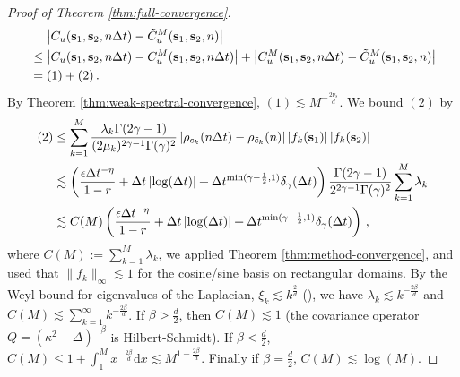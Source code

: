 \documentclass[12pt]{article} %
\newcommand{\dint}{\text{d}}
\newcommand{\abs}[1]{\left| #1 \right|}
\begin{document}
\begin{proof}[Proof of Theorem \ref{thm:full-convergence}]

\begin{align*}
    & \, \quad \abs{C_u(\mathbf{s}_1, \mathbf{s}_2, {n \Delta t}) - \Tilde{C}_u^M(\mathbf{s}_1, \mathbf{s}_2, n)} \\
    & \leq \abs{C_u(\mathbf{s}_1, \mathbf{s}_2, {n \Delta t}) - C_u^M(\mathbf{s}_1, \mathbf{s}_2, {n \Delta t})} + \abs{C_u^M(\mathbf{s}_1, \mathbf{s}_2, {n \Delta t}) - \Tilde{C}_u^M(\mathbf{s}_1, \mathbf{s}_2, n)} \\
    & = (1) + (2) \, .
\end{align*}
By Theorem \ref{thm:weak-spectral-convergence}, $(1) \lesssim M^{-\frac{2\nu_s}{d}}$. We bound $(2)$ by 
\begin{align*}
    (2) &\leq \sum_{k = 1}^M \frac{\lambda_k \Gamma(2 \gamma - 1)}{(2 \mu_k)^{2 \gamma - 1}\Gamma(\gamma)^2} \abs{\rho_{c_k}({n \Delta t}) - \rho_{\Tilde{c}_k}(n)} \abs{f_k(\mathbf{s}_1)} \abs{f_k(\mathbf{s}_2)} \\
    & \lesssim \left( \frac{\epsilon \Delta t^{- \eta}}{1 - r} + \Delta t \abs{\log(\Delta t)} + \Delta t^{\min(\gamma - \frac{1}{2}, 1)} \delta_{\gamma}(\Delta t) \right) \frac{\Gamma(2 \gamma - 1)}{2^{2 \gamma - 1} \Gamma(\gamma)^2} \sum_{k = 1}^M \lambda_k\\
    & \lesssim C(M) \left(\frac{\epsilon \Delta t^{ - \eta}}{1 - r} + \Delta t \abs{\log(\Delta t)} + \Delta t^{\min(\gamma - \frac{1}{2}, 1)} \delta_{\gamma}(\Delta t)\right) \, ,
\end{align*}
where $C(M) := \sum_{k = 1}^M \lambda_k$, we applied Theorem \ref{thm:method-convergence}, and used that $\|f_k\|_\infty \lesssim 1$ for the cosine/sine basis on rectangular domains. %
 By the Weyl bound for eigenvalues of the Laplacian,  $\xi_k \lesssim k^{\frac{2}{d}}$ (\cite{davies1995,Lablee2015-pi}), we have  $\lambda_k\lesssim k^{-\frac{2\beta}d}$ and $C(M) \lesssim \sum_{k = 1}^\infty k^{-\frac{2\beta}{d}}$.
If $\beta > \frac{d}{2}$, then  $C(M) 
\lesssim 1$ (the covariance operator $Q = (\kappa^2 - \Delta)^{-\beta}$ is Hilbert-Schmidt). If $\beta < \frac{d}{2}$, 
$C(M)\leq  1 + \int_{1}^M x^{-\frac{2\beta}{d}} \dint x\lesssim M^{1 - \frac{2 \beta}{d}}$. Finally if $\beta = \frac{d}{2}$, $C(M)\lesssim \log(M)$.\qedhere
\end{proof}
\end{document}
